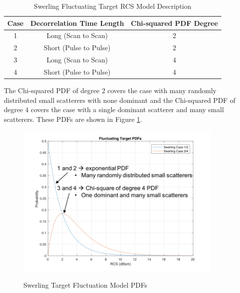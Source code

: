 \begin{table}[H]
  \begin{center}
      \renewcommand{\baselinestretch}{1} \small\normalsize
  \begin{quote}
    \caption[Swerling Fluctuating Target RCS Model Description]{Swerling Fluctuating Target RCS Model Description\label{env_tab:1}}
  \end{quote}
  \begin{tabular} {|c | c | c |}
    \hline
  \bf{Case} & \bf{Decorrelation Time Length} & \bf{Chi-squared PDF Degree} \\ \hline
  1 &Long (Scan to Scan) &2 \\ \hline
  2 &Short (Pulse to Pulse) &2 \\ \hline
  3 &Long (Scan to Scan) &4 \\ \hline
  4 &Short (Pulse to Pulse) &4 \\ \hline
\end{tabular}
\end{center}
\end{table}
\renewcommand{\baselinestretch}{2} \small\normalsize
The Chi-squared PDF of degree $2$ covers the case with many randomly distributed small scatterers with none dominant and the Chi-squared PDF of degree $4$ covers the case with a single dominant scatterer and many small scatterers. These PDFs are shown in Figure \ref{env_fig:2}.
\begin{figure}[H]
  \begin{center}
\includegraphics[width=4in]{../media/multistatic/swerling_pdfs.png}
  \end{center}
  \renewcommand{\baselinestretch}{1} \small\normalsize
  \begin{quote}
    \caption[Swerling Target Fluctuation Model PDFs]{Swerling Target Fluctuation Model PDFs\label{env_fig:2}}
  \end{quote}
\end{figure}
\renewcommand{\baselinestretch}{2} \small\normalsize

